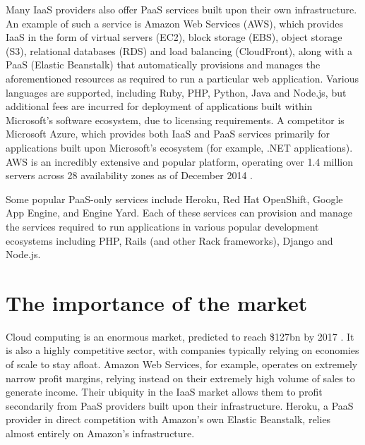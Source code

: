 \documentclass[a4paper]{proc}
\begin{document}
  Many IaaS providers also offer PaaS services built upon their own infrastructure. An example of such a service is Amazon Web Services (AWS), which provides IaaS in the form of virtual servers (EC2), block storage (EBS), object storage (S3), relational databases (RDS) and load balancing (CloudFront), along with a PaaS (Elastic Beanstalk) that automatically provisions and manages the aforementioned resources as required to run a particular web application. Various languages are supported, including Ruby, PHP, Python, Java and Node.js, but additional fees are incurred for deployment of applications built within Microsoft's software ecosystem, due to licensing requirements. A competitor is Microsoft Azure, which provides both IaaS and PaaS services primarily for applications built upon Microsoft's ecosystem (for example, .NET applications). AWS is an incredibly extensive and popular platform, operating over 1.4 million servers across 28 availability zones as of December 2014 \cite{Mathews2014}.

  Some popular PaaS-only services include Heroku, Red Hat OpenShift, Google App Engine, and Engine Yard. Each of these services can provision and manage the services required to run applications in various popular development ecosystems including PHP, Rails (and other Rack frameworks), Django and Node.js.

  \section{The importance of the market}
  \label{sec:market}


  Cloud computing is an enormous market, predicted to reach \$127bn by 2017 \cite{GIA2013}. It is also a highly competitive sector, with companies typically relying on economies of scale to stay afloat. Amazon Web Services, for example, operates on extremely narrow profit margins, relying instead on their extremely high volume of sales to generate income. Their ubiquity in the IaaS market allows them to profit secondarily from PaaS providers built upon their infrastructure. Heroku, a PaaS provider in direct competition with Amazon's own Elastic Beanstalk, relies almost entirely on Amazon's infrastructure.
\end{document}
